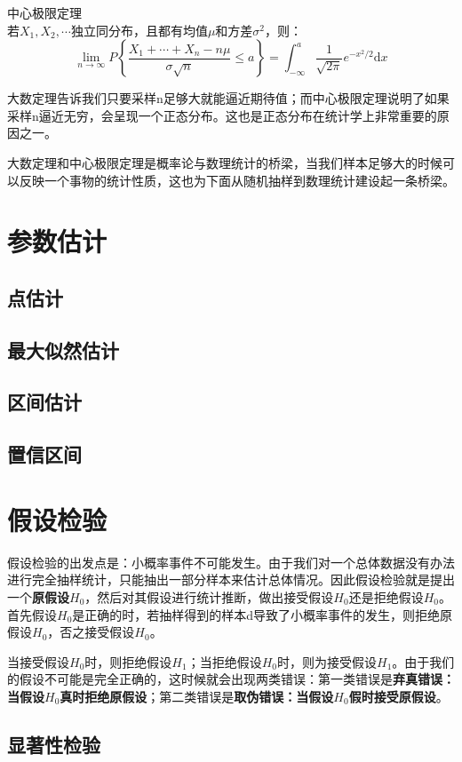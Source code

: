 \begin{theorem}{中心极限定理\\}
    若$X_1,X_2,\cdots$独立同分布，且都有均值$\mu$和方差$\sigma ^2$，则：
    \begin{equation}
        \lim_{n\rightarrow \infty} 
        P\left\{\frac{X_1+\cdots+X_n-n\mu}{\sigma \sqrt{n}}  \leq a \right\}=
        \int _{-\infty}^{a} \frac{1}{\sqrt{2\pi}}e^{-x^2/2}\mathrm{d}x
    \end{equation}
\end{theorem}
大数定理告诉我们只要采样n足够大就能逼近期待值；而中心极限定理说明了如果采样n逼近无穷，会呈现一个正态分布。这也是正态分布在统计学上非常重要的原因之一。

大数定理和中心极限定理是概率论与数理统计的桥梁，当我们样本足够大的时候可以反映一个事物的统计性质，这也为下面从随机抽样到数理统计建设起一条桥梁。

\section{参数估计}
\subsection{点估计}
\subsection{最大似然估计}
\subsection{区间估计}
\subsection{置信区间}

\section{假设检验}
假设检验的出发点是：小概率事件不可能发生。由于我们对一个总体数据没有办法进行完全抽样统计，只能抽出一部分样本来估计总体情况。因此假设检验就是提出一个\textbf{原假设$H_0$}，然后对其假设进行统计推断，做出接受假设$H_0$还是拒绝假设$H_0$。首先假设$H_0$是正确的时，若抽样得到的样本d导致了小概率事件的发生，则拒绝原假设$H_0$，否之接受假设$H_0$。

当接受假设$H_0$时，则拒绝假设$H_1$；当拒绝假设$H_0$时，则为接受假设$H_1$。由于我们的假设不可能是完全正确的，这时候就会出现两类错误：第一类错误是\textbf{弃真错误：当假设$H_0$真时拒绝原假设}；第二类错误是\textbf{取伪错误：当假设$H_0$假时接受原假设}。

\subsection{显著性检验}